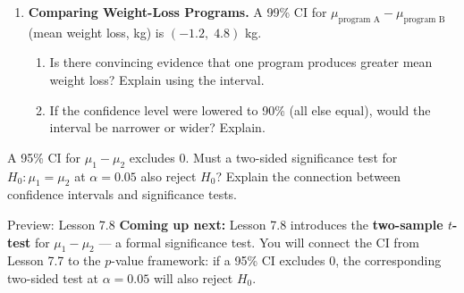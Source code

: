 \documentclass[10pt]{article}
\begin{document}
\begin{enumerate}
\begin{enumerate}[label=\alph*.]
  \item By what factor is Team B's interval narrower than Team A's? \gradedhide{\writeline}\gradedright{\gradedblank[id=hw3c, type=short, points=1, answer=2, check=numeric, tolerance=0, display={\boldmath$2$ (B's is half as wide)}]{2.3in}{0.19in}}
\end{enumerate}

\vspace{0.06in}

\newpage
\item \textbf{Comparing Weight-Loss Programs.} \quad
A 99\% CI for $\mu_{\text{program A}} - \mu_{\text{program B}}$ (mean weight loss, kg) is
$(-1.2,\; 4.8)$ kg.

\begin{enumerate}[label=\alph*.]
  \boxguard
  \item Is there convincing evidence that one program produces greater mean weight loss?
        Explain using the interval. 
  \boxguard
  \item If the confidence level were lowered to 90\% (all else equal), would the interval
        be narrower or wider? Explain. 
\end{enumerate}

\end{enumerate}

\begin{extensionbox}
A 95\% CI for $\mu_1 - \mu_2$ excludes 0. Must a two-sided significance test for
$H_0: \mu_1 = \mu_2$ at $\alpha = 0.05$ also reject $H_0$? Explain the connection
between confidence intervals and significance tests.
\end{extensionbox}

\begin{notesbox}{Preview: Lesson 7.8}
\textbf{Coming up next:} Lesson 7.8 introduces the \textbf{two-sample $t$-test} for
$\mu_1 - \mu_2$ --- a formal significance test. You will connect the CI from Lesson 7.7
to the $p$-value framework: if a 95\% CI excludes 0, the corresponding two-sided test
at $\alpha = 0.05$ will also reject $H_0$.
\end{notesbox}
\end{document}

